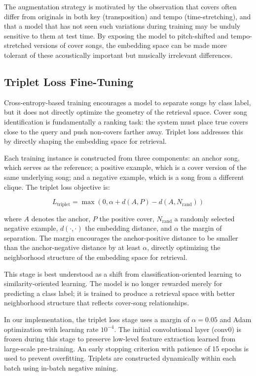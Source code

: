 \documentclass[conference]{IEEEtran}
\begin{document}
The augmentation strategy is motivated by the observation that covers often differ from originals in both key (transposition) and tempo (time-stretching), and that a model that has not seen such variations during training may be unduly sensitive to them at test time. By exposing the model to pitch-shifted and tempo-stretched versions of cover songs, the embedding space can be made more tolerant of these acoustically important but musically irrelevant differences.

\subsection{Triplet Loss Fine-Tuning}

Cross-entropy-based training encourages a model to separate songs by class label, but it does not directly optimize the geometry of the retrieval space. Cover song identification is fundamentally a ranking task: the system must place true covers close to the query and push non-covers farther away. Triplet loss addresses this by directly shaping the embedding space for retrieval.

Each training instance is constructed from three components: an anchor song, which serves as the reference; a positive example, which is a cover version of the same underlying song; and a negative example, which is a song from a different clique. The triplet loss objective is:

\begin{equation}
L_{\text{triplet}} = \max \left(0, \alpha + d(A, P) - d(A, N_{\text{rand}}) \right)
\label{eq:triplet}
\end{equation}

where $A$ denotes the anchor, $P$ the positive cover, $N_{\text{rand}}$ a randomly selected negative example, $d(\cdot, \cdot)$ the embedding distance, and $\alpha$ the margin of separation. The margin encourages the anchor-positive distance to be smaller than the anchor-negative distance by at least $\alpha$, directly optimizing the neighborhood structure of the embedding space for retrieval.

This stage is best understood as a shift from classification-oriented learning to similarity-oriented learning. The model is no longer rewarded merely for predicting a class label; it is trained to produce a retrieval space with better neighborhood structure that reflects cover-song relationships.

In our implementation, the triplet loss stage uses a margin of $\alpha = 0.05$ and Adam optimization with learning rate $10^{-4}$. The initial convolutional layer (conv0) is frozen during this stage to preserve low-level feature extraction learned from large-scale pre-training. An early stopping criterion with patience of 15 epochs is used to prevent overfitting. Triplets are constructed dynamically within each batch using in-batch negative mining.
\end{document}
